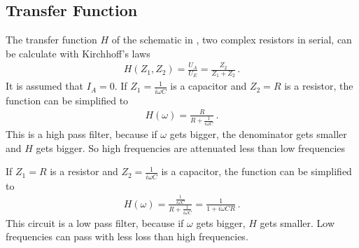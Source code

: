 \documentclass[11pt, a4paper]{article}
\begin{document}
\FloatBarrier
\subsection{Transfer Function}
The transfer function $H$ of the schematic in \cite[figure 5]{TRA}, two complex resistors in serial, can be calculate with Kirchhoff's laws
\begin{align}
    H\left(Z_1, Z_2\right) = \frac{U_A}{U_E} = \frac{Z_2}{Z_1 + Z_2} \,.
\end{align}
It is assumed that $I_A = 0$.
If $Z_1 = \frac{1}{i \omega C}$ is a capacitor and $Z_2 = R$ is a resistor, the function can be simplified to
\begin{align}
    H\left( \omega \right) = \frac{R}{R + \frac{1}{i \omega C}}\,.
\end{align}
This is a high pass filter, because if $\omega$ gets bigger, the denominator gets smaller and $H$ gets bigger. So high frequencies are attenuated less than low frequencies

If $Z_1 = R$ is a resistor and $Z_2  = \frac{1}{i \omega C}$ is a capacitor, the function can be simplified to
\begin{align}
    H\left(\omega\right) = \frac{\frac{1}{i \omega C}}{R + \frac{1}{i \omega C}} = \frac{1}{1 + i \omega C R} \,.
\end{align}
This circuit is a low pass filter, because if $\omega$ gets bigger, $H$ gets smaller. Low frequencies can pass with less loss than high frequencies.



\end{document}
